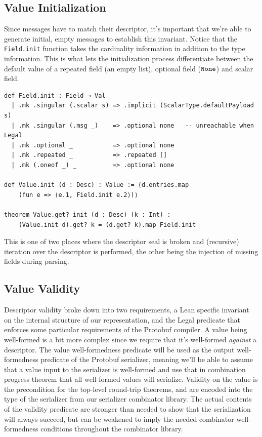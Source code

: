 \subsection{Value Initialization}\label{sec:msg-init}

Since messages have to match their descriptor, it's important that we're able to
generate initial, empty messages to establish this invariant. Notice that the
\texttt{Field.init} function takes the cardinality information in addition to the
type information. This is what lets the initialization process differentiate
between the default value of a repeated field (an empty list), optional field
($\mathtt{None}$) and scalar field.

\begin{verbatim}
def Field.init : Field → Val
  | .mk .singular (.scalar s) => .implicit (ScalarType.defaultPayload s)
  | .mk .singular (.msg _)    => .optional none   -- unreachable when Legal
  | .mk .optional _           => .optional none
  | .mk .repeated _           => .repeated []
  | .mk (.oneof _) _          => .optional none

def Value.init (d : Desc) : Value := ⟨d.entries.map
    (fun e => ⟨e.1, Field.init e.2⟩)⟩

theorem Value.get?_init (d : Desc) (k : Int) :
    (Value.init d).get? k = (d.get? k).map Field.init
\end{verbatim}

This is one of two places where the descriptor seal is broken and (recursive) iteration over
the descriptor is performed, the other being the injection of missing fields
during parsing. 

\subsection{Value Validity} 

Descriptor validity broke down into two requirements, a Lean specific invariant
on the internal structure of our representation, and the Legal predicate that
enforces some particular requirements of the Protobuf compiler. A value being
well-formed is a bit more complex since we require that it's well-formed
\emph{against} a descriptor. The value well-formedness predicate will be used as
the output well-formedness predicate of the Protobuf serializer, meaning we'll
be able to assume that a value input to the serializer is well-formed and
use that in combination progress theorem that all well-formed values will
serialize. Validity on the value is the precondition for the top-level
round-trip theorems, and are encoded into the type of the serializer from our
serializer combinator library. The actual contents of the validity predicate are
stronger than needed to show that the serialization will always succeed, but can
be weakened to imply the needed combinator well-formedness conditions throughout the
combinator library.

